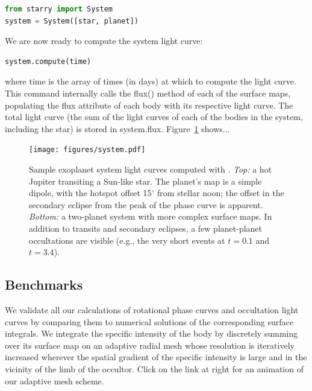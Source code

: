 \documentclass[modern]{aastex61}
\begin{document}
%
\begin{lstlisting}[language=Python,firstnumber=last]
from starry import System
system = System([star, planet])
\end{lstlisting}
%
We are now ready to compute the system light curve:
%
\begin{lstlisting}[language=Python,firstnumber=last]
system.compute(time)
\end{lstlisting}
%
where \textsf{time} is the array of times (in days) at which to compute the
light curve. This command internally calls the \textsf{flux()} method of each
of the surface maps, populating the \textsf{flux} attribute of each body
with its respective light curve. The total light curve (the sum of the
light curves of each of the bodies in the system, including the star) is
stored in \textsf{system.flux}. Figure~\ref{fig:system} shows... 

%
\begin{figure}[ht!]
    \begin{centering}
    \texttt{[image: figures/system.pdf]}
    \caption{\label{fig:system}
             Sample exoplanet system light curves computed with \starry.
             \emph{Top:} a hot Jupiter
             transiting a Sun-like star. The planet's map is a simple dipole,
             with the hotspot offset 15$^\circ$ from stellar noon; the offset
             in the secondary eclipse from the peak of the phase curve is
             apparent. \emph{Bottom:} a two-planet system with more complex
             surface maps. In addition to transits and secondary eclipses,
             a few planet-planet occultations are visible (e.g., the very short
             events at $t=0.1$ and $t=3.4$).}
    \end{centering}
\end{figure}
%

\subsection{Benchmarks}
\label{sec:starrybenchmarks}

We validate all our calculations of rotational phase curves and occultation
light curves by comparing them to numerical solutions of the corresponding
surface integrals. We integrate the specific intensity of the body by
discretely summing over its surface map on an adaptive radial mesh whose
resolution is iteratively increased wherever the spatial gradient of the
specific intensity is large and in the vicinity of the limb of the occultor.
 Click on the link at right for an animation of our
adaptive mesh scheme.
\end{document}
